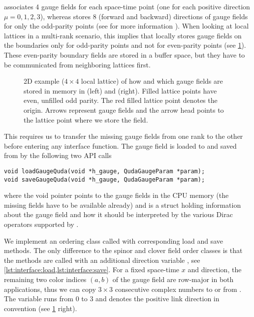\Quda associates \num{4} gauge fields for each space-time point (one for each positive direction $\mu=0,1,2,3$), whereas \openqxd stores \num{8} (forward and backward) directions of gauge fields for only the odd-parity points (see  for more information \cite{openqxd}). When looking at local lattices in a multi-rank scenario, this implies that \openqxd locally stores gauge fields on the boundaries only for odd-parity points and not for even-parity points (see \cref{fig:gauge}). These even-parity boundary fields are stored in a buffer space, but they have to be communicated from neighboring lattices first.
\begin{figure}
  \caption{2D example ($4 \times 4$ local lattice) of how and which gauge fields are stored in memory in \openqxd (left) and \quda (right). Filled lattice points have even, unfilled odd parity. The red filled lattice point denotes the origin. Arrows represent gauge fields and the arrow head points to the lattice point where we store the field.}
  \label{fig:gauge}
\end{figure}

This requires us to transfer the missing gauge fields from one rank to the other before entering any \quda interface function. The gauge field is loaded to and saved from \quda by the following two API calls
\begin{verbatim}
void loadGaugeQuda(void *h_gauge, QudaGaugeParam *param);
void saveGaugeQuda(void *h_gauge, QudaGaugeParam *param);
\end{verbatim}
where the void pointer  points to the gauge fields in the CPU memory (the missing fields have to be available already) and  is a struct holding information about the gauge field and how it should be interpreted by the various Dirac operators supported by \quda.

We implement an ordering class called  with corresponding load and save methods.
The only difference to the spinor and clover field order classes is that the methods are called with an additional direction variable , see \cref{lst:interface:load,lst:interface:save}.
For a fixed space-time $x$ and direction, the remaining two color indices $(a,b)$ of the gauge field are row-major in both applications, thus we can copy $3\times 3$ consecutive complex numbers to or from .
The variable  runs from $0$ to $3$ and denotes the positive link direction in \quda convention (see \cref{fig:gauge} right).

